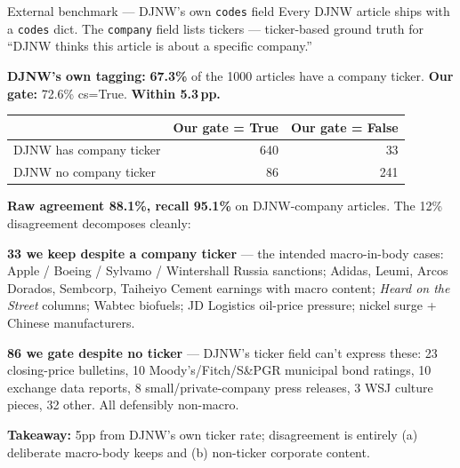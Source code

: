 \documentclass[10pt,aspectratio=169]{beamer}
\begin{document}
\begin{frame}{External benchmark --- DJNW's own \texttt{codes} field}
  \scriptsize
  Every DJNW article ships with a \texttt{codes} dict. The \texttt{company} field lists
  tickers --- ticker-based ground truth for ``DJNW thinks this article is about a specific
  company.''

  \vspace{0.3em}
  \textbf{DJNW's own tagging:} \textbf{67.3\%} of the 1000 articles have a company ticker.
  \textbf{Our gate:} 72.6\% cs=True. \textbf{Within 5.3\,pp.}

  \vspace{0.4em}
  \centering
  \setlength{\tabcolsep}{8pt}
  \renewcommand{\arraystretch}{1.15}
  \begin{tabular}{lrr}
    \toprule
                            & \textbf{Our gate = True} & \textbf{Our gate = False} \\
    \midrule
    DJNW has company ticker & 640 & 33 \\
    DJNW no company ticker  &  86 & 241 \\
    \bottomrule
  \end{tabular}

  \vspace{0.4em}
  \raggedright
  \textcolor{goodgreen}{\textbf{Raw agreement 88.1\%, recall 95.1\%}} on DJNW-company
  articles. The 12\% disagreement decomposes cleanly:

  \vspace{0.3em}
  \textbf{33 we keep despite a company ticker} --- the intended macro-in-body cases: Apple /
  Boeing / Sylvamo / Wintershall Russia sanctions; Adidas, Leumi, Arcos Dorados, Sembcorp,
  Taiheiyo Cement earnings with macro content; \emph{Heard on the Street} columns; Wabtec
  biofuels; JD Logistics oil-price pressure; nickel surge + Chinese manufacturers.

  \textbf{86 we gate despite no ticker} --- DJNW's ticker field can't express these:
  23 closing-price bulletins, 10 Moody's/Fitch/S\&PGR municipal bond ratings, 10 exchange
  data reports, 8 small/private-company press releases, 3 WSJ culture pieces, 32 other.
  All defensibly non-macro.

  \vspace{0.2em}
  \textcolor{goodgreen}{\textbf{Takeaway:}} 5pp from DJNW's own ticker rate; disagreement
  is entirely (a) deliberate macro-body keeps and (b) non-ticker corporate content.
\end{frame}
\end{document}
